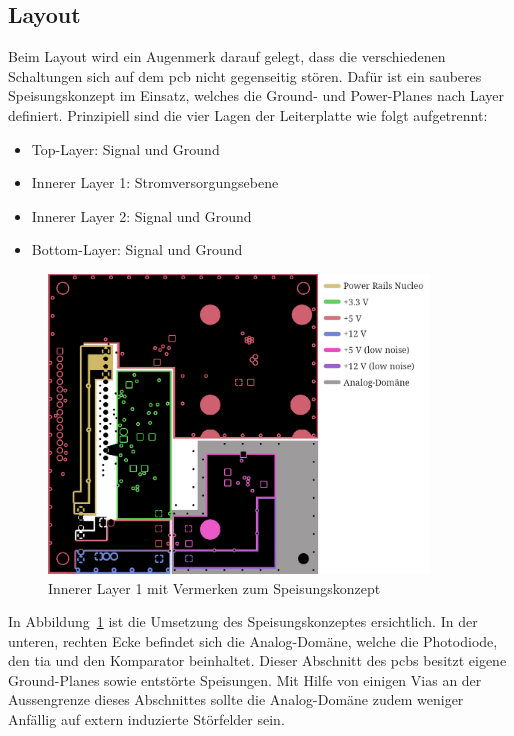 \pagebreak

\subsection{Layout}\label{sec:layout}

Beim Layout wird ein Augenmerk darauf gelegt, dass die verschiedenen Schaltungen sich auf dem \acrshort{pcb} nicht
gegenseitig stören. Dafür ist ein sauberes Speisungskonzept im Einsatz, welches die Ground- und Power-Planes nach Layer
definiert. Prinzipiell sind die vier Lagen der Leiterplatte wie folgt aufgetrennt:

\begin{itemize}
    \item Top-Layer: Signal und Ground
    \item Innerer Layer 1: Stromversorgungsebene
    \item Innerer Layer 2: Signal und Ground
    \item Bottom-Layer: Signal und Ground
\end{itemize}

\begin{figure}[H]
    \centering
    \includegraphics[width=0.9\textwidth]{graphics/layout_annotated.png}
    \caption{Innerer Layer 1 mit Vermerken zum Speisungskonzept}\label{fig:layout_annotated}
\end{figure}

In Abbildung~\ref{fig:layout_annotated} ist die Umsetzung des Speisungskonzeptes ersichtlich. In der unteren, rechten Ecke
befindet sich die Analog-Domäne, welche die Photodiode, den \acrshort{tia} und den Komparator beinhaltet. Dieser Abschnitt
des \acrshort{pcb}s besitzt eigene Ground-Planes sowie entstörte Speisungen. Mit Hilfe von einigen Vias an der Aussengrenze
dieses Abschnittes sollte die Analog-Domäne zudem weniger Anfällig auf extern induzierte Störfelder sein.

